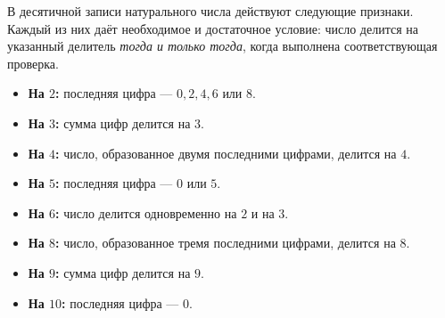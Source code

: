 \documentclass[12pt,a4paper]{article}
\theoremstyle{definition}
\theoremstyle{plain}
\theoremstyle{remark}
\begin{document}
В десятичной записи натурального числа действуют следующие признаки.
Каждый из них даёт необходимое и достаточное условие: число делится на указанный делитель
\emph{тогда и только тогда}, когда выполнена соответствующая проверка.

\begin{itemize}[leftmargin=1.5em,itemsep=4pt]
\item \textbf{На \(2\):} последняя цифра --- \(0,2,4,6\) или \(8\).
\item \textbf{На \(3\):} сумма цифр делится на \(3\).
\item \textbf{На \(4\):} число, образованное двумя последними цифрами, делится на \(4\).
\item \textbf{На \(5\):} последняя цифра --- \(0\) или \(5\).
\item \textbf{На \(6\):} число делится одновременно на \(2\) и на \(3\).
\item \textbf{На \(8\):} число, образованное тремя последними цифрами, делится на \(8\).
\item \textbf{На \(9\):} сумма цифр делится на \(9\).
\item \textbf{На \(10\):} последняя цифра --- \(0\).
\end{itemize}
\end{document}
